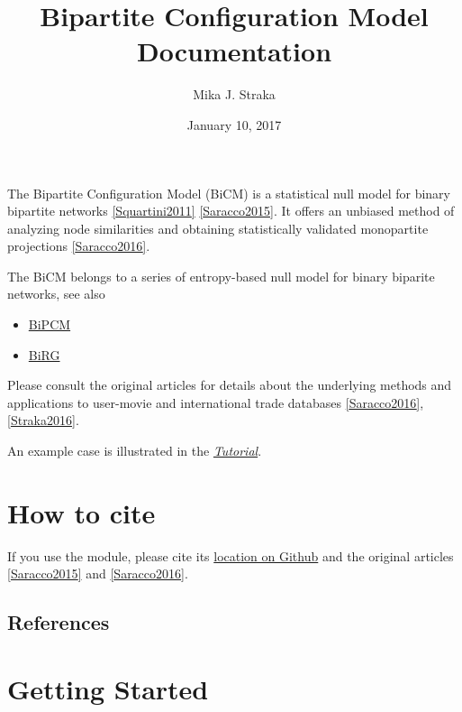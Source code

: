 \documentclass[letterpaper,10pt,english]{sphinxmanual}
\title{Bipartite Configuration Model Documentation}
\date{January 10, 2017}
\author{Mika J. Straka}
\begin{document}
\maketitle
\tableofcontents
{}\label{index::doc}


The Bipartite Configuration Model (BiCM) is a statistical null model for binary
bipartite networks {\hyperref[index:squartini2011]{{[}Squartini2011{]}}} {\hyperref[index:saracco2015]{{[}Saracco2015{]}}}. It offers an unbiased method of analyzing node
similarities and obtaining statistically validated monopartite projections
{\hyperref[index:saracco2016]{{[}Saracco2016{]}}}.

The BiCM belongs to a series of entropy-based null model for binary biparite
networks, see also
\begin{itemize}
\item {} 
\href{https://github.com/tsakim/bipcm}{BiPCM}

\item {} 
\href{https://github.com/tsakim/birg}{BiRG}

\end{itemize}

Please consult the original articles for details about the underlying methods
and applications to user-movie and international trade databases
{\hyperref[index:saracco2016]{{[}Saracco2016{]}}}, {\hyperref[index:straka2016]{{[}Straka2016{]}}}.

An example case is illustrated in the {\hyperref[source/tutorial:tutorial]{\emph{Tutorial}}}.


\chapter{How to cite}
\label{index:bipartite-configuration-model-documentation}\label{index:how-to-cite}
If you use the  module, please cite its \href{https://github.com/tsakim/bicm}{location on Github} and the original articles {\hyperref[index:saracco2015]{{[}Saracco2015{]}}} and
{\hyperref[index:saracco2016]{{[}Saracco2016{]}}}.


\section{References}
\label{index:references}

\chapter{Getting Started}
\label{index:getting-started}
\end{document}
